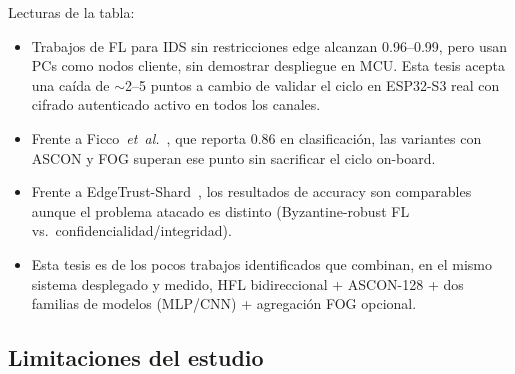 Lecturas de la tabla:
\begin{itemize}[noitemsep, topsep=0pt]
    \item Trabajos de FL para IDS sin restricciones edge \cite{Hajj2023_CrossLayerFL_IDS, Chaurasia2024_FL_ResNet_IIoT, Roy2023_FL_AdaptedModel} alcanzan 0.96--0.99, pero usan PCs como nodos cliente, sin demostrar despliegue en MCU. Esta tesis acepta una caída de $\sim$2--5 puntos a cambio de validar el ciclo en ESP32-S3 real con cifrado autenticado activo en todos los canales.
    \item Frente a Ficco~\textit{et~al.}~\cite{Ficco2024_FL_TinyML_Onboard}, que reporta 0.86 en clasificación, las variantes con ASCON y FOG superan ese punto sin sacrificar el ciclo on-board.
    \item Frente a EdgeTrust-Shard~\cite{Tran2026_EdgeTrustShard}, los resultados de accuracy son comparables aunque el problema atacado es distinto (Byzantine-robust FL vs.\ confidencialidad/integridad).
    \item Esta tesis es de los pocos trabajos identificados que combinan, en el mismo sistema desplegado y medido, HFL bidireccional + ASCON-128 + dos familias de modelos (MLP/CNN) + agregación FOG opcional.
\end{itemize}

\subsection{Limitaciones del estudio}
\label{subsec:limitations}

